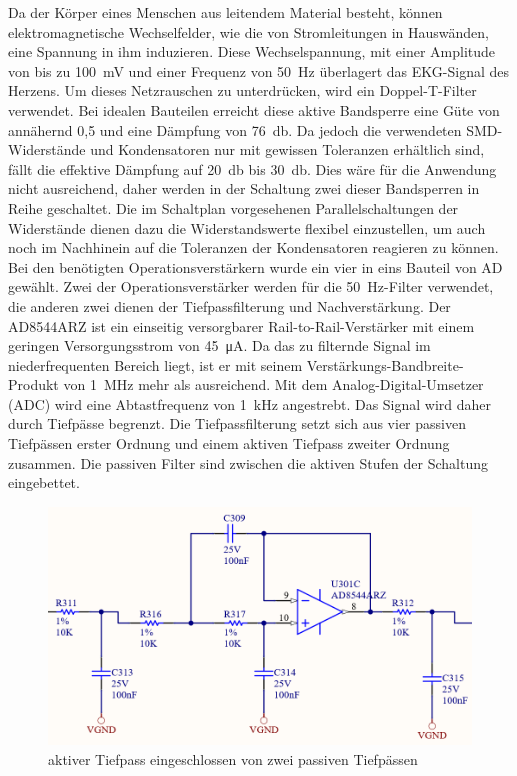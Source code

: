 Da der Körper eines Menschen aus leitendem Material besteht, können elektromagnetische Wechselfelder, wie die von Stromleitungen in Hauswänden, eine Spannung in ihm induzieren. Diese Wechselspannung, mit einer Amplitude von bis zu \SI{100}{\milli\volt} und einer Frequenz von \SI{50}{\hertz} überlagert das EKG-Signal des Herzens. Um dieses Netzrauschen zu unterdrücken, wird ein Doppel-T-Filter verwendet. Bei idealen Bauteilen erreicht diese aktive Bandsperre eine Güte von annähernd 0,5 und eine Dämpfung von \SI{76}{\decibel}. Da jedoch die verwendeten SMD-Widerstände und Kondensatoren nur mit gewissen Toleranzen erhältlich sind, fällt die effektive Dämpfung auf \SI{20}{\decibel} bis \SI{30}{\decibel}. Dies wäre für die Anwendung nicht ausreichend, daher werden in der Schaltung zwei dieser Bandsperren in Reihe geschaltet. Die im Schaltplan vorgesehenen Parallelschaltungen der Widerstände dienen dazu die Widerstandswerte flexibel einzustellen, um auch noch im Nachhinein auf die Toleranzen der Kondensatoren reagieren zu können. Bei den benötigten Operationsverstärkern wurde ein vier in eins Bauteil von AD gewählt. Zwei der Operationsverstärker werden für die \SI{50}{\hertz}-Filter verwendet, die anderen zwei dienen der Tiefpassfilterung und Nachverstärkung. Der AD8544ARZ ist ein einseitig versorgbarer Rail-to-Rail-Verstärker mit einem geringen Versorgungsstrom von \SI{45}{\micro\ampere}. Da das zu filternde Signal im niederfrequenten Bereich liegt, ist er mit seinem Verstärkungs-Bandbreite-Produkt von \SI{1}{\mega\hertz} mehr als ausreichend. Mit dem Analog-Digital-Umsetzer (ADC) wird eine Abtastfrequenz von \SI{1}{\kilo\hertz} angestrebt. Das Signal wird daher durch Tiefpässe begrenzt. Die Tiefpassfilterung setzt sich aus vier passiven Tiefpässen erster Ordnung und einem aktiven Tiefpass zweiter Ordnung zusammen. Die passiven Filter sind zwischen die aktiven Stufen der Schaltung eingebettet.

\begin{figure} [!h]
	\includegraphics[width=\textwidth] {EKG_aktiver_Tiefpassfilter.png}
	\caption{aktiver Tiefpass eingeschlossen von zwei passiven Tiefpässen}
	\label{aktiver Tiefpass} 
\end{figure}

